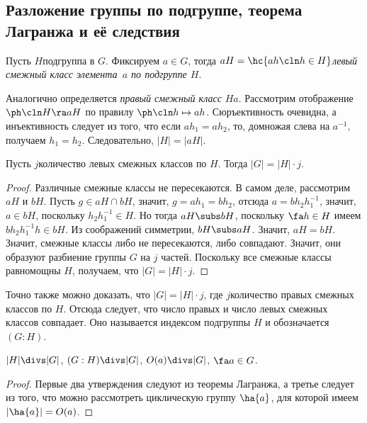 \documentclass[a4paper]{article}
\begin{document}
\subsection{Разложение группы по подгруппе, теорема Лагранжа и её следствия}

\begin{df}
Пусть $H$\т подгруппа в $G$. Фиксируем $a \in G$, тогда $aH=\hc{ah\cln h \in H}$\т \emph{левый
смежный класс элемента~$a$ по подгруппе $H$}.
\end{df}

Аналогично определяется \emph{правый смежный класс} $Ha$. Рассмотрим отображение $\ph\cln H \ra aH$ по
правилу $\ph\cln h \mapsto ah$. Сюръективность очевидна, а инъективность следует из того, что
если $ah_1=ah_2$, то, домножая слева на $a^{-1}$, получаем $h_1=h_2$. Следовательно, $|H| =|aH|$.

\begin{theorem}[Лагранжа]
Пусть $j$\т количество левых смежных классов по $H$. Тогда $|G|=|H| \cdot j$.
\end{theorem}
\begin{proof}
Различные смежные классы не пересекаются. В самом деле, рассмотрим $aH$ и $bH$.  Пусть $g \in aH \cap bH$,
значит, $g=ah_1=bh_2$, отсюда $a = bh_2h_1^{-1}$, значит, $a \in bH$, поскольку $h_2h_1^{-1} \in H$. Но тогда
$aH \subs bH$, поскольку $\fa h \in H$ имеем $bh_2h_1^{-1}h \in bH$. Из соображений симметрии, $bH \subs aH$.
Значит, $aH=bH$. Значит, смежные классы либо не пересекаются, либо совпадают. Значит, они образуют разбиение
группы $G$ на $j$ частей. Поскольку все смежные классы равномощны $H$, получаем, что $|G|=|H|\cdot j$.
\end{proof}

\begin{note}
Точно также можно доказать, что $|G| = |H| \cdot j$, где $j$\т количество правых  смежных классов по $H$.
Отсюда следует, что число правых и число левых смежных классов совпадает. Оно называется индексом подгруппы
$H$ и обозначается $(G:H)$.
\end{note}

\begin{imp}
$|H| \divs |G|$, $(G:H) \divs |G|$, $O(a) \divs |G|$, $\fa a \in G$.
\end{imp}
\begin{proof}
Первые два утверждения следуют из теоремы Лагранжа, а третье следует из того, что  можно рассмотреть
циклическую группу $\ha{a}$, для которой имеем $|\ha{a}|=O(a)$.
\end{proof}
\end{document}
